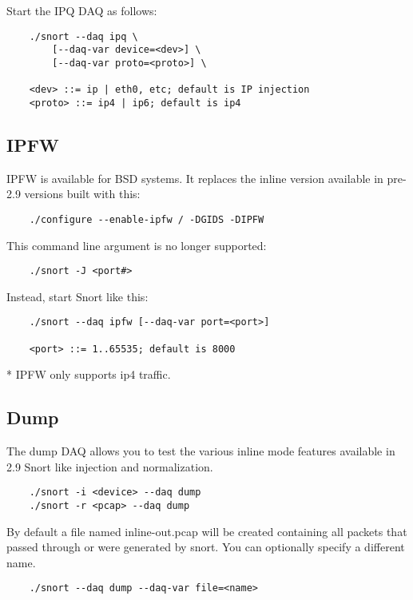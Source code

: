 \documentclass[english]{report}
\begin{document}
Start the IPQ DAQ as follows:

\begin{verbatim}
    ./snort --daq ipq \
        [--daq-var device=<dev>] \
        [--daq-var proto=<proto>] \

    <dev> ::= ip | eth0, etc; default is IP injection
    <proto> ::= ip4 | ip6; default is ip4
\end{verbatim}

\subsection{IPFW}

IPFW is available for BSD systems.  It replaces the inline version available in
pre-2.9 versions built with this:

\begin{verbatim}
    ./configure --enable-ipfw / -DGIDS -DIPFW
\end{verbatim}

This command line argument is no longer supported:

\begin{verbatim}
    ./snort -J <port#>
\end{verbatim}

Instead, start Snort like this:

\begin{verbatim}
    ./snort --daq ipfw [--daq-var port=<port>]

    <port> ::= 1..65535; default is 8000
\end{verbatim}

* IPFW only supports ip4 traffic.

\subsection{Dump}

The dump DAQ allows you to test the various inline mode features available in
2.9 Snort like injection and normalization.

\begin{verbatim}
    ./snort -i <device> --daq dump
    ./snort -r <pcap> --daq dump
\end{verbatim}

By default a file named inline-out.pcap will be created containing all packets
that passed through or were generated by snort.  You can optionally specify a
different name.

\begin{verbatim}
    ./snort --daq dump --daq-var file=<name>
\end{verbatim}
\end{document}
